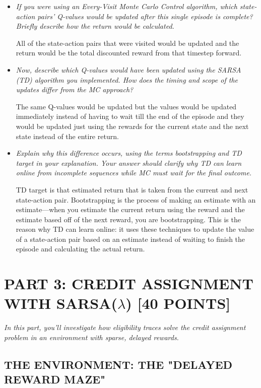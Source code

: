 \documentclass{article}
\begin{document}
\begin{itemize}
    \item \textit{If you were using an Every-Visit Monte Carlo Control algorithm, which state-action pairs' Q-values would be updated after this single episode is complete? Briefly describe how the return would be calculated.}
    
    All of the state-action pairs that were visited would be updated and the return would be the total discounted reward from that timestep forward.
    
    \item \textit{Now, describe which Q-values would have been updated using the SARSA (TD) algorithm you implemented. How does the timing and scope of the updates differ from the MC approach?}
    
    The same Q-values would be updated but the values would be updated immediately instead of having to wait till the end of the episode and they would be updated just using the rewards for the current state and the next state instead of the entire return.
    
    \item \textit{Explain why this difference occurs, using the terms bootstrapping and TD target in your explanation. Your answer should clarify why TD can learn online from incomplete sequences while MC must wait for the final outcome.}
    
    TD target is that estimated return that is taken from the current and next state-action pair. Bootstrapping is the process of making an estimate with an estimate—when you estimate the current return using the reward and the estimate based off of the next reward, you are bootstrapping. This is the reason why TD can learn online: it uses these techniques to update the value of a state-action pair based on an estimate instead of waiting to finish the episode and calculating the actual return.
\end{itemize}

\section{PART 3: CREDIT ASSIGNMENT WITH SARSA($\lambda$) [40 POINTS]}

\textit{In this part, you'll investigate how eligibility traces solve the credit assignment problem in an environment with sparse, delayed rewards.}

\subsection{THE ENVIRONMENT: THE "DELAYED REWARD MAZE"}
\end{document}
